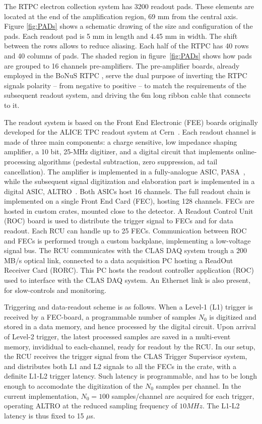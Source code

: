 \documentclass[twocolumn,showpacs,superscriptaddress,groupedaddress]{revtex4}
\begin{document}
The RTPC electron collection system has 3200 readout pads. These elements are
located at the end of the amplification region, 69 mm from the central axis.
Figure \ref{fig:PADs} shows a schematic drawing of the size and 
configuration of the pads. Each readout pad is 5 mm in length and 4.45 mm in 
width.  The shift between the rows allows to reduce aliasing. Each half of the 
RTPC has 40 rows and 40 columns of pads. The shaded region in figure~\ref{fig:PADs} 
shows how pads are grouped to 16 channels pre-amplifiers. The pre-amplifier boards, 
already employed in the BoNuS RTPC \cite{BONUS-NIM}, serve the dual purpose of 
inverting the RTPC signals polarity -- from negative to positive -- to match the 
requirements of the subsequent readout system, and driving the 6m long ribbon 
cable that connects to it.

The readout system is based on the Front End Electronic (FEE) boards originally 
developed for the ALICE TPC readout system at Cern~\cite{ALICE-FEE}. Each 
readout channel is made of three main components: a charge sensitive, low 
impedance shaping amplifier, a 10 bit, 25-MHz digitizer, and a digital circuit 
that implements online-processing algorithms (pedestal subtraction, zero 
suppression, ad tail cancellation). The amplifier is implemented in a 
fully-analogue ASIC, PASA~\cite{ALICE-PASA}, while the subsequent signal 
digitization and elaboration part is implemented in a digital ASIC, 
ALTRO~\cite{ALICE-ALTRO}. Both ASICs host 16 channels. The full readout 
chain is implemented on a single Front End Card (FEC), hosting 128 channels. 
FECs are hosted in custom crates, mounted close to the detector. A Readout 
Control Unit (ROC) board is used to distribute the trigger signal to FECs 
and for data readout. Each RCU can handle up to 25 FECs. Communication 
between ROC and FECs is performed trough a custom backplane, implementing 
a low-voltage signal bus. The RCU communicates with the CLAS DAQ system 
trough a 200 MB/s optical link, connected to a data acquisition PC hosting 
a ReadOut Receiver Card (RORC). This PC hosts the readout controller 
application (ROC) used to interface with the CLAS DAQ system. An Ethernet 
link is also present, for slow-controls and monitoring.

Triggering and data-readout scheme is as follows. When a Level-1 (L1) trigger 
is received by a FEC-board, a programmable number of samples $N_0$ is digitized 
and stored in a data memory, and hence processed by the digital circuit. Upon 
arrival of Level-2 trigger, the latest processed samples are saved in a 
multi-event memory, invididual to each-channel, ready for readout by the RCU. 
In our setup, the RCU receives the trigger signal from the CLAS Trigger 
Supervisor system, and distributes both L1 and L2 signals to all the FECs in 
the crate, with a definite L1-L2 trigger latency. Such latency is programmable, 
and has to be longh enough to accomodate the digitization of the $N_0$ samples 
per channel. In the current implementation, $N_0=100$ samples/channel are 
acquired for each trigger, operating ALTRO at the reduced sampling frequency 
of $10 MHz$. The L1-L2 latency is thus fixed to 15 $\mu$s.
\end{document}
